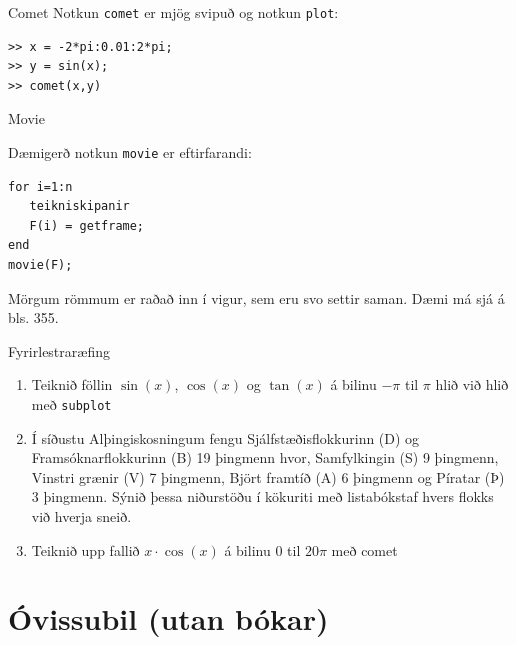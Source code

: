 \documentclass{beamer}
\begin{document}
\begin{frame}[fragile]{Comet}
Notkun \texttt{comet} er mjög svipuð og notkun \texttt{plot}:
\begin{verbatim}
>> x = -2*pi:0.01:2*pi;
>> y = sin(x);
>> comet(x,y)
\end{verbatim}
\end{frame}

\begin{frame}[fragile]{Movie}

Dæmigerð notkun \texttt{movie} er eftirfarandi:
\begin{verbatim}
for i=1:n
   teikniskipanir
   F(i) = getframe;
end
movie(F);
\end{verbatim}
Mörgum römmum er raðað inn í vigur, sem eru svo settir saman. Dæmi má sjá á bls. 355.

\end{frame}

\begin{frame}{Fyrirlestraræfing}
\begin{enumerate}
 \setcounter{enumi}{0}
 \item Teiknið föllin $\sin(x)$, $\cos(x)$ og $\tan(x)$ á bilinu $-\pi$ til $\pi$ hlið við hlið með \texttt{subplot}
 \item Í síðustu Alþingiskosningum fengu Sjálfstæðisflokkurinn (D) og Framsóknarflokkurinn (B) 19 þingmenn hvor, Samfylkingin (S) 9 þingmenn, Vinstri grænir (V) 7 þingmenn, Björt framtíð (A) 6 þingmenn og Píratar (Þ) 3 þingmenn. Sýnið þessa niðurstöðu í kökuriti með listabókstaf hvers flokks við hverja sneið.
 \item Teiknið upp fallið $x\cdot \cos(x)$ á bilinu $0$ til $20\pi$ með comet
\end{enumerate}
\end{frame}

\section{Óvissubil (utan bókar)}
\end{document}
